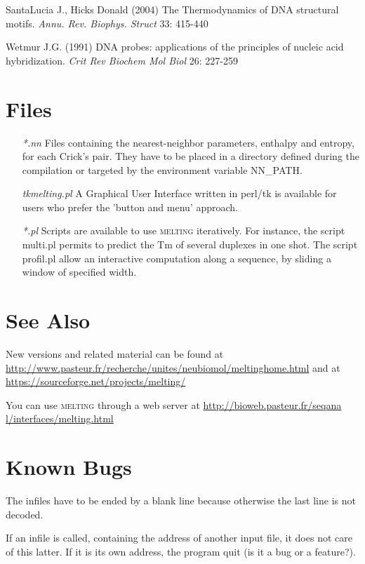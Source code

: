 \documentclass{article}
\begin{document}
SantaLucia  J., Hicks Donald (2004) The Thermodynamics of DNA structural motifs. 
\textit{Annu. Rev. Biophys. Struct} 33: 415-440 
  
  Wetmur J.G. (1991) DNA probes: applications of the principles of nucleic 
acid hybridization. \textit{Crit Rev Biochem Mol Biol} 26: 227-259   
   
\section{Files }
\begin{itemize}
\item [\textit{*.nn}] Files containing the nearest-neighbor parameters, enthalpy and entropy, 
for each Crick's pair.  They have to be placed in a directory defined during 
the compilation or targeted by the  environment variable NN\_PATH.  
\item [\textit{tkmelting.pl}] A Graphical User Interface written in perl/tk is available for users
who prefer  the 'button and menu' approach.  
\item [\textit{*.pl}] Scripts are available to 
use \textsc{melting} iteratively. For instance, the script multi.pl permits to predict 
the Tm of several duplexes in one shot. The script profil.pl allow
an interactive computation along a sequence, by sliding a window of specified width. 
  
\end{itemize}
 
\section{See Also }
New versions and 
related material can be found at \url{http://www.pasteur.fr/recherche/unites/neubiomol/meltinghome.html} 
and at \url{https://sourceforge.net/projects/melting/}
  
You can use \textsc{melting} through a web server at \url{http://bioweb.pasteur.fr/seqana
l/interfaces/melting.html}
  
\section{Known Bugs }
The infiles have to be ended by a blank line because otherwise the last line is not decoded.

If an infile is called, containing the 
address of another input file, it does not care of this latter.  If it 
is its own address, the program quit (is it a bug or a feature?).   
 
\end{document}

